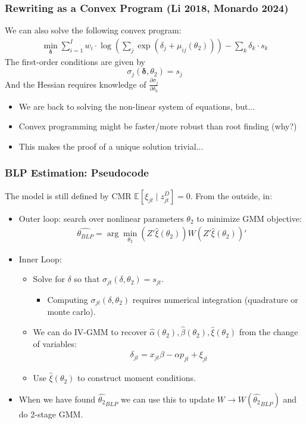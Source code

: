 \documentclass[aspectratio=169,10pt]{beamer}
\begin{document}
 \begin{frame}
\frametitle{Rewriting as a Convex Program (Li 2018, Monardo 2024)}
We can also solve the following convex program:
\begin{align*}
    \min_{\symbf{\delta}}  \sum_{i=1}^I w_i \cdot \log \left(\sum_{j} \exp\left(\delta_j  + \mu_{ij}(\theta_2) \right) \right) - \sum_k \delta_k \cdot s_{k}
\end{align*}
The first-order conditions are given by
$$\sigma_j(\symbf{\delta},\theta_2) = s_j$$
And the Hessian requires knowledge of $\frac{\partial \sigma_{j}}{\partial \delta_{k}}$
\begin{itemize}
    \item We are back to solving the non-linear system of equations, but...
    \item Convex programming might be faster/more robust than root finding (why?)
    \item This makes the proof of a unique solution trivial...
  \end{itemize}
 \end{frame}





 \begin{frame}
\frametitle{BLP Estimation: Pseudocode}
\footnotesize
The model is still defined by CMR $\mathbb{E}[\xi_{jt} \mid  z_{jt}^D]=0$. From the outside, in:
\begin{itemize}
\item Outer loop: search over nonlinear parameters $\theta_2$ to minimize GMM objective:
 \begin{align*}
 \widehat{\theta_{BLP}} = \arg \min_{\theta_2} (Z' \widehat{\xi}(\theta_2)) W  (Z' \widehat{\xi}(\theta_2))'
 \end{align*}
 \item Inner Loop:
 \begin{itemize}
\item Solve for $\delta$ so that $\sigma_{jt}(\delta,\theta_2) = s_{jt}$.
\begin{itemize}
\item Computing $\sigma_{jt}(\delta,\theta_2)$ requires numerical integration (quadrature or monte carlo).
\end{itemize}
 \item We can do IV-GMM to recover $\hat{\alpha}(\theta_2),\widehat{\beta}(\theta_2),\widehat{\xi}(\theta_2)$ from the change of variables:
  \begin{align*}
\delta_{jt}= x_{jt} \beta -\alpha p_{jt}+  \xi_{jt}
 \end{align*}
  \item Use $\widehat{\xi}(\theta_2)$ to construct moment conditions.
 \end{itemize}
 \item When we have found $\widehat{\theta_2}_{BLP}$ we can use this to update $W \rightarrow W(\widehat{\theta_2}_{BLP})$ and do 2-stage GMM.
 \end{itemize}
\end{frame}
\end{document}

